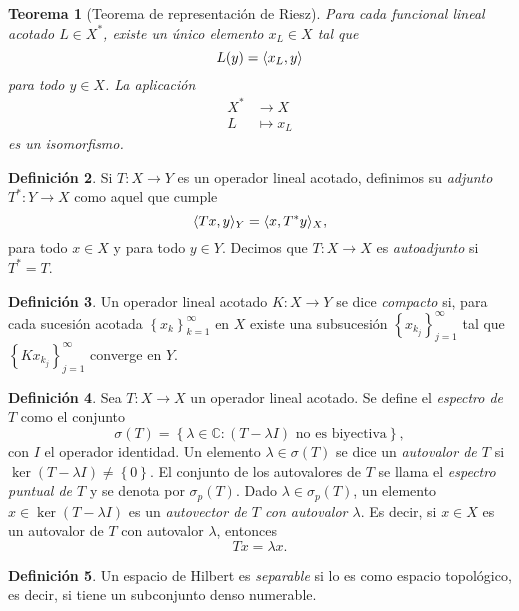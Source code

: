 \documentclass[12pt,a4paper]{article}
\newtheorem{thm}{Teorema}[section]
\theoremstyle{definition} \newtheorem{defn}[thm]{Definición}
\theoremstyle{definition} \newtheorem{ejemplo}[thm]{Ejemplo}
\theoremstyle{definition} \newtheorem{ejercicio}[thm]{Ejercicio}
\theoremstyle{remark} \newtheorem*{obs}{Observación}
\DeclarePairedDelimiter\esc{\langle}{\rangle}
\newcommand{\CC}{\mathbb{C}}
\begin{document}
 \begin{thm}[Teorema de representación de Riesz]
   Para cada funcional lineal acotado $L\in X^*$, existe un único elemento $x_L \in X$ tal que
   \begin{equation*}
     L(y) = \esc{x_L,y}
   \end{equation*}
   para todo $y\in X$. La aplicación 
   \begin{align*}
      X^*&\longrightarrow X\\ 
       L &\longmapsto x_L 
     \end{align*}
     es un isomorfismo.
 \end{thm}
 \begin{defn}
   Si $T:X\rightarrow Y$ es un operador lineal acotado, definimos su \emph{adjunto} $T^*:Y\rightarrow X$ como aquel que cumple
   \begin{equation*}
     \esc{Tx,y}_Y=\esc{x,T^*y}_X,
   \end{equation*}
   para todo $x \in X$ y para todo $y\in Y$. Decimos que $T:X\rightarrow X$ es \emph{autoadjunto} si $T^*=T$.
 \end{defn}
 \begin{defn}
   Un operador lineal acotado $K:X\rightarrow Y$ se dice \emph{compacto} si, para cada sucesión acotada $\left\{ x_k \right\}_{k=1}^\infty$ en $X$ existe una subsucesión $\left\{ x_{k_j} \right\}_{j=1}^\infty$ tal que $\left\{ Kx_{k_j} \right\}_{j=1}^\infty$ converge en $Y$.
 \end{defn}
 \begin{defn}
   Sea $T:X\rightarrow X$ un operador lineal acotado. Se define el \emph{espectro de $T$} como el conjunto
   \begin{equation*}
     \sigma(T)=\left\{ \lambda \in \CC: (T-\lambda I) \text{ no es biyectiva} \right\},
   \end{equation*}
   con $I$ el operador identidad.
   Un elemento $\lambda \in \sigma(T)$ se dice un \emph{autovalor de $T$} si $\ker(T-\lambda I)\neq \left\{ 0 \right\}$. El conjunto de los autovalores de $T$ se llama el \emph{espectro puntual de $T$} y se denota por $\sigma_p(T)$. Dado $\lambda \in \sigma_p(T)$, un elemento $x\in \ker(T-\lambda I)$ es un \emph{autovector de $T$ con autovalor $\lambda$}. Es decir, si $x\in X$ es un autovalor de $T$ con autovalor $\lambda$, entonces
   \begin{equation*}
     Tx = \lambda x.
   \end{equation*}
 \end{defn}
 \begin{defn}
   Un espacio de Hilbert es \emph{separable} si lo es como espacio topológico, es decir, si tiene un subconjunto denso numerable.
 \end{defn}
\end{document}
